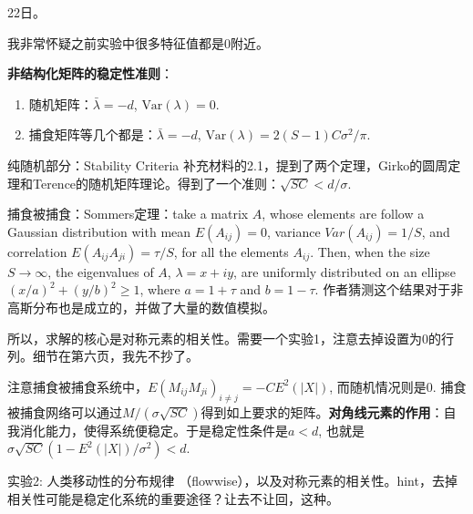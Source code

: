 22日。

我非常怀疑之前实验中很多特征值都是0附近。

\textbf{非结构化矩阵的稳定性准则}：\begin{enumerate}
    \item 随机矩阵：$\bar{\lambda} = -d$, $\text{Var}(\lambda) = 0$.
    \item 捕食矩阵等几个都是：$\bar{\lambda} = -d$, $\text{Var}(\lambda) = 2(S-1)C\sigma^2/\pi$. 
\end{enumerate}

纯随机部分：Stability Criteria 补充材料的2.1，提到了两个定理，Girko的圆周定理和Terence的随机矩阵理论。得到了一个准则：$\sqrt{SC} < d / \sigma$.

捕食被捕食：Sommers定理：take a matrix $A$, whose elements are follow a Gaussian distribution with mean $E(A_{ij}) = 0$, variance $Var(A_{ij}) = 1/S$, and correlation $E(A_{ij}A_{ji}) = \tau/S$, for all the elements $A_{ij}$. Then, when the size $S \to \infty$, the eigenvalues of $A$, $\lambda = x + iy$, are uniformly distributed on an ellipse $(x/a)^{2} + (y/b)^{2} \geq 1$, where $a = 1 + \tau$ and $b = 1 − \tau$. 作者猜测这个结果对于非高斯分布也是成立的，并做了大量的数值模拟。

所以，求解的核心是对称元素的相关性。需要一个实验1，注意去掉设置为0的行列。细节在第六页，我先不抄了。

注意捕食被捕食系统中，$E(M_{ij}M_{ji})_{i \ne j} = -CE^{2}(|X|)$, 而随机情况则是$0$. 捕食被捕食网络可以通过$M/(\sigma \sqrt{SC})$得到如上要求的矩阵。\textbf{对角线元素的作用}：自我消化能力，使得系统便稳定。于是稳定性条件是$a < d$, 也就是 $\sigma\sqrt{SC}(1-E^{2}(|X|)/\sigma^{2}) < d$.

实验2: 人类移动性的分布规律 （flowwise），以及对称元素的相关性。hint，去掉相关性可能是稳定化系统的重要途径？让去不让回，这种。